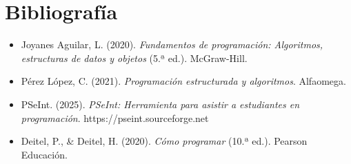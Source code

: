 \documentclass[12pt,a4paper]{article}
\begin{document}
	
	
	\newpage
	
	\section{\textcolor{azulUNEMI}{Bibliografía}}
	
	
	\begin{itemize}
		\item Joyanes Aguilar, L. (2020). \textit{Fundamentos de programación: Algoritmos, estructuras de datos y objetos} (5.ª ed.). McGraw-Hill.
		
		\item Pérez López, C. (2021). \textit{Programación estructurada y algoritmos}. Alfaomega.
		
		\item PSeInt. (2025). \textit{PSeInt: Herramienta para asistir a estudiantes en programación}. https://pseint.sourceforge.net
		
		\item Deitel, P., \& Deitel, H. (2020). \textit{Cómo programar} (10.ª ed.). Pearson Educación.
	\end{itemize}
	\newpage
	
	\tableofcontents
	
\end{document}

